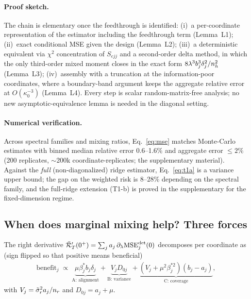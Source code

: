 \paragraph{Proof sketch.}
The chain is elementary once the feedthrough is identified: (i)~a per-coordinate representation of the estimator including the feedthrough term (Lemma~L1); (ii)~exact conditional MSE given the design (Lemma~L2); (iii)~a deterministic equivalent via $\chi^2$ concentration of $S_{ejj}$ and a second-order delta method, in which the only third-order mixed moment closes in the exact form $8\lambda^3 b_j^3\delta_j^2/n_h^2$ (Lemma~L3); (iv)~assembly with a truncation at the information-poor coordinates, where a boundary-band argument keeps the aggregate relative error at $O(\kappa_0^{-3})$ (Lemma~L4).
Every step is scalar random-matrix-free analysis; no new asymptotic-equivalence lemma is needed in the diagonal setting.

\paragraph{Numerical verification.}
Across spectral families and mixing ratios, Eq.~\eqref{eq:mse} matches Monte-Carlo estimates with binned median relative error 0.6--1.6\% and aggregate error $\le 2\%$ (200 replicates, $\sim$200k coordinate-replicates; the supplementary material).
Against the \emph{full} (non-diagonalized) ridge estimator, Eq.~\eqref{eq:t1a} is a variance upper bound; the gap on the weighted risk is 8--28\% depending on the spectral family, and the full-ridge extension (T1-b) is proved in the supplementary for the fixed-dimension regime.

\subsection{When does marginal mixing help? Three forces}

\begin{corollary}\label{cor:c1}
The right derivative $\bar{\mathcal{R}}_T'(0^+) = \sum_j a_j\, \partial_\lambda \mathrm{MSE}^{\det}_j(0)$ decomposes per coordinate as (sign flipped so that positive means beneficial)
\begin{align}
  \mathrm{benefit}_j \;\propto\;
  \underbrace{\mu \beta^*_j b_j \delta_j}_{\text{A: alignment}}
  + \underbrace{V_j D_{0j}}_{\text{B: variance}}
  + \underbrace{(V_j + \mu^2\beta_j^{*2})(b_j - a_j)}_{\text{C: coverage}},
  \label{eq:c1}
\end{align}
with $V_j = \tilde\sigma_r^2 a_j / n_r$ and $D_{0j} = a_j + \mu$.
\end{corollary}

